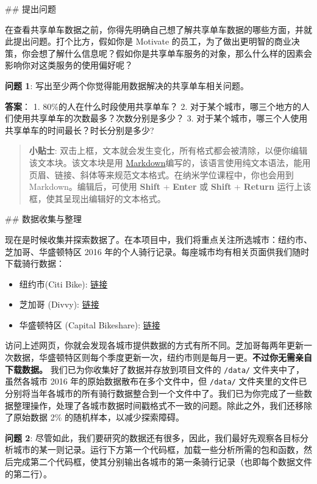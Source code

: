 \documentclass[11pt]{article}
\providecommand{\tightlist}{%
      \setlength{\itemsep}{0pt}\setlength{\parskip}{0pt}}
\begin{document}
 \#\# 提出问题

在查看共享单车数据之前，你得先明确自己想了解共享单车数据的哪些方面，并就此提出问题。打个比方，假如你是
Motivate
的员工，为了做出更明智的商业决策，你会想了解什么信息呢？假如你是共享单车服务的对象，那么什么样的因素会影响你对这类服务的使用偏好呢？

\textbf{问题 1}: 写出至少两个你觉得能用数据解决的共享单车相关问题。

\textbf{答案}： 1. 80\%的人在什么时段使用共享单车？ 2.
对于某个城市，哪三个地方的人们使用共享单车的次数最多？次数分别是多少？
3. 对于某个城市，哪三个人使用共享单车的时间最长？时长分别是多少?

\begin{quote}
\textbf{小贴士}:
双击上框，文本就会发生变化，所有格式都会被清除，以便你编辑该文本块。该文本块是用
\href{http://daringfireball.net/projects/markdown/syntax}{Markdown}编写的，该语言使用纯文本语法，能用页眉、链接、斜体等来规范文本格式。在纳米学位课程中，你也会用到
Markdown。编辑后，可使用 \textbf{Shift} + \textbf{Enter} 或
\textbf{Shift} + \textbf{Return}
运行上该框，使其呈现出编辑好的文本格式。
\end{quote}

 \#\# 数据收集与整理

现在是时候收集并探索数据了。在本项目中，我们将重点关注所选城市：纽约市、芝加哥、华盛顿特区
2016 年的个人骑行记录。每座城市均有相关页面供我们随时下载骑行数据：

\begin{itemize}
\tightlist
\item
  纽约市(Citi Bike):
  \href{https://www.citibikenyc.com/system-data}{链接}
\item
  芝加哥 (Divvy): \href{https://www.divvybikes.com/system-data}{链接}
\item
  华盛顿特区 (Capital Bikeshare):
  \href{https://www.capitalbikeshare.com/system-data}{链接}
\end{itemize}

访问上述网页，你就会发现各城市提供数据的方式有所不同。芝加哥每两年更新一次数据，华盛顿特区则每个季度更新一次，纽约市则是每月一更。\textbf{不过你无需亲自下载数据。}
我们已为你收集好了数据并存放到项目文件的 \texttt{/data/}
文件夹中了，虽然各城市 2016 年的原始数据散布在多个文件中，但
\texttt{/data/}
文件夹里的文件已分别将当年各城市的所有骑行数据整合到一个文件中了。我们已为你完成了一些数据整理操作，处理了各城市数据时间戳格式不一致的问题。除此之外，我们还移除了原始数据
2\% 的随机样本，以减少探索障碍。

\textbf{问题 2}:
尽管如此，我们要研究的数据还有很多，因此，我们最好先观察各目标分析城市的某一则记录。运行下方第一个代码框，加载一些分析所需的包和函数，然后完成第二个代码框，使其分别输出各城市的第一条骑行记录（也即每个数据文件的第二行）。
\end{document}
